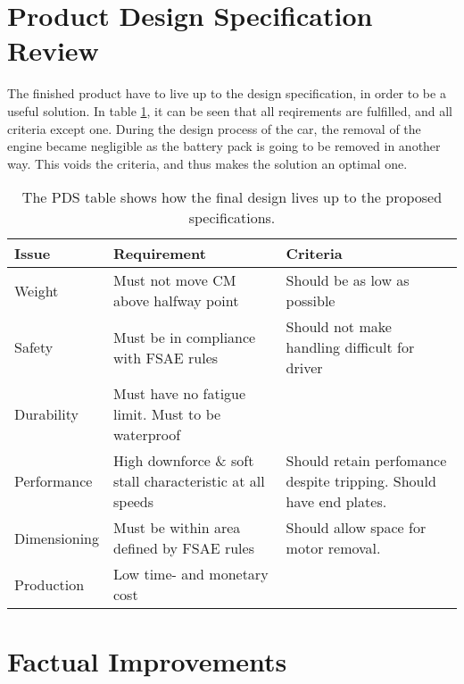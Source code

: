 \section{Product Design Specification Review}

  The finished product have to live up to the design specification, in order to be a useful solution. In table \ref{tab:designreview}, it can be seen that all reqirements are fulfilled, and all criteria except one. During the design process of the car, the removal of the engine became negligible as the battery pack is going to be removed in another way. This voids the criteria, and thus makes the solution an optimal one.

  \begin{table}
    \begin{tabularx}{\textwidth}[t]{>{\columncolor{seapurple!40}}l XX}
      \arrayrulecolor{seapurple}\hline
      \rowcolor{white}
      \textbf{\textcolor{seapurple}{Issue}} & \textbf{\textcolor{seapurple}{Requirement}} & \textbf{\textcolor{seapurple}{Criteria}}\\
      \hline
      Weight & \cellcolor{seagreen!40}Must not move CM above halfway point & \cellcolor{seagreen!40}Should be as low as possible \\
      Safety & \cellcolor{seagreen!40}Must be in compliance with FSAE rules & \cellcolor{seagreen!40}Should not make handling difficult for driver\\
      Durability & \cellcolor{seagreen!40} Must have no fatigue limit. Must to be waterproof \\
      Performance & \cellcolor{seagreen!40} High downforce \& soft stall characteristic at all speeds &\cellcolor{seagreen!40} Should retain perfomance despite tripping. Should have end plates.\\
      Dimensioning & \cellcolor{seagreen!40} Must be within area defined by FSAE rules & \cellcolor{seayellow!40} Should allow space for motor removal. \\
      Production & \cellcolor{seagreen!40} Low time- and monetary cost
      \label{tab:designreview}
    \end{tabularx}
    \caption{The PDS table shows how the final design lives up to the proposed specifications.}
  \end{table}

  \section{Factual Improvements}

